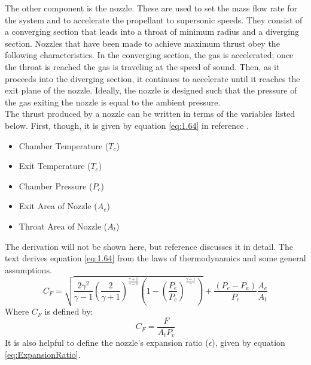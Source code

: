 The other component is the nozzle. These are used to set the mass flow rate for the system and to accelerate the propellant to supersonic speeds. They consist of a converging section that leads into a throat of minimum radius and a diverging section. Nozzles that have been made to achieve maximum thrust obey the following characteristics. In the converging section, the gas is accelerated; once the throat is reached the gas is traveling at the speed of sound. Then, as it proceeds into the diverging section, it continues to accelerate until it reaches the exit plane of the nozzle. Ideally, the nozzle is designed such that the pressure of the gas exiting the nozzle is equal to the ambient pressure. \\
The thrust produced by a nozzle can be written in terms of the variables listed below. First, though, it is given by equation \ref{eq:1.64} in reference \cite{RocketPropulsion}.
\begin{itemize}
\item Chamber Temperature ($T_c$)
\item Exit Temperature ($T_e$)
\item Chamber Pressure ($P_c$)
\item Exit Area of Nozzle ($A_e$)
\item Throat Area of Nozzle ($A_t$)
\end{itemize}%
%
%
%
%
%
The derivation will not be shown here, but reference \cite{RocketPropulsion} discusses it in detail. The text derives equation \ref{eq:1.64} from the laws of thermodynamics and some general assumptions.
\begin{equation}\label{eq:1.64}
C_F= \sqrt{\frac{2\gamma^2}{\gamma-1}\left(\frac{2}{\gamma+1}\right)^{\frac{\gamma+1}{\gamma-1}}\left(1-\left(\frac{P_e}{P_c}\right)^{\frac{\gamma-1}{\gamma}}\right)}+\frac{\left(P_e-P_a\right)}{P_c}\frac{A_e}{A_t}
\end{equation}%
%
%
%
%
Where $C_F$ is defined by:
\begin{equation}\label{eq:ThrustCoefficient}
C_F=\frac{F}{A_tP_c}
\end{equation}
It is also helpful to define the nozzle's expansion ratio ($\epsilon$), given by equation \ref{eq:ExpansionRatio}.
